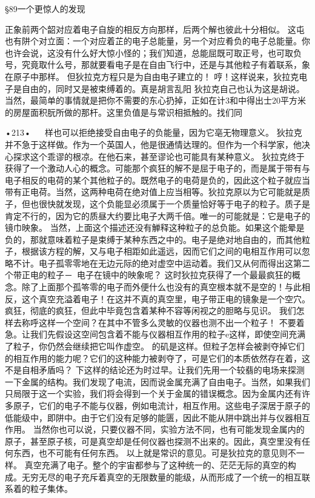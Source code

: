 §89一个更惊人的发现

正象前两个韶对应着电子自旋的相反方向那样，后两个解也彼此十分相似。
这屯也有阱个对立面：一个对应着芷的电子总能量，另一个对应肴负的电子总能量。你也许会说，这没有什么好大惊小怪的；我们知道，总能屈既可取正号，也可取负号，究竟取什么号，那就要看电子是在自由飞行中，还是与其他粒子有着联系，象在原子中那样。
但狄拉克方程只是为自由电子建立的！
哼！这样说来，狄拉克电子是自由的，同时又是被束缚着的。真是胡言乱阳
狄拉克自己也认为这是胡说。当然，最简单的事情就是把你不需要的东心扔掉，正如在计3和中得出士20平方米的房屋面积朊所做的那杆。这里负值是与常识相抵触的。找们同

•213•
  
样也可以拒绝接受自由电子的负能量，因为它亳无物理意义。
狄拉克并不急于这样做。作为一个英国人，他是很通情达理的。但作为一个科学家，他决心探求这个乖谬的根凉。在他石来，甚至谬论也可能具有某种意义。
狄拉克终于获得了一个激动人心的概念。可能那个疯狂的解不是屈于电子的，而是属于带有与电子相反的电荷的某个其他粒子的。既然电子的电荷是负的，因此这个粒子就应当带有正电荷。当然，这两种电荷在绝对值上应当相等。狄拉克原以为它可能就是质子，但也很快就发现，这个负能显必须属于一个质量恰好等于电子的粒子。质子是肯定不行的，因为它的质昼大约要比电子大两千倍。唯一的可能就是：它是电子的镜巾映象。
当然，上面这个描述还没有觯释这种粒子的总负能。如果这个能晕是负的，那就意味着粒子是束缚于某种东西之中的。电子是绝对地自由的，而其他粒子，根据该方程的解，又与电子相距如此遥远，因而它们之间的电相互作用可以忽略不计。电子孤零零地在无边元际的绝对虚空中运动着。我们又从何而得出这第二个带正电的粒子－~电子在镜中的映象呢？
这时狄拉克获得了一个最最疯狂的概念。除了上面那个孤笭零的电子而外便什么也没有的真空根本就不是空的！与此相反，这个真空充溢着电子！在这并不真的真空里，电子带正电的镜象是一个空穴。
疯狂，彻底的疯狂，但此中毕竟包含着某种不容等闲视之的胆略与见识。
我们怎样去称呼这样一个空间？在其中不管多么灵敏的仪器也测不出一个粒子！
不要着急。让我们先假设这空间包含着不能与仪器相互作用的粒子e这样，即使空间充满了粒子，你仍然会继续把它叫作虚空。
的矶是这样。但粒子怎样会被剥夺掉它们的相互作用的能力呢？它们的这种能力被剥夺了，可是它们的本质依然存在着，这不是自相矛盾吗？
下这样的结论还为时过早。让我们先用一个较翡的电场来探测一下金属的结构。我们发现了电流，因而说金属充满了自由电子。当然，如果我们只局限于这一个实验，我们将会得到一个关于金属的错误概念。因为金属内还有许多原子，它们的电子不能与仪器，例如电流计，相互作用。这些电子深居于原子的低能级中，即阱中。由于它们没有足够的能匮，因此不能从阱中跳出并与仪器相互作用。
当然你也可以说，只要仪器不同，实验方法不同，也有可能发现金属内的原子，甚至原子核，可是真空却是任何仪器也探测不出来的。因此，真空里没有任何东西，也不可能有任何东西。
以上就是常识的意见。可是狄拉克的意见则不一样。
真空充满了电子。整个的宇宙都参与了这种统一的、茫茫无际的真空的构成。无穷无尽的电子充斥着真空的无限数量的能级，从而形成了一个统一的相互联系着的粒子集体。


